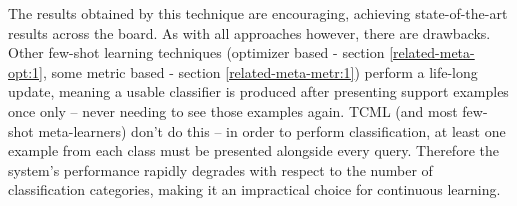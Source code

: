\documentclass{report}
\begin{document}
	The results obtained by this technique are encouraging, achieving state-of-the-art results across the board. As with all approaches however, there are drawbacks. Other few-shot learning techniques (optimizer based - section \ref{related-meta-opt:1}, some metric based - section \ref{related-meta-metr:1}) perform a life-long update, meaning a usable classifier is produced after presenting support examples once only -- never needing to see those examples again. TCML (and most few-shot meta-learners) don't do this -- in order to perform classification, at least one example from each class must be presented alongside every query. Therefore the system's performance rapidly degrades with respect to the number of classification categories, making it an impractical choice for continuous learning. \par
	
\end{document}
